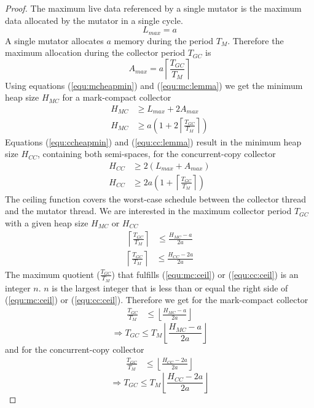 \begin{proof}
The maximum live data referenced by a single mutator is the maximum
data allocated by the mutator in a single cycle.
\begin{equation}
    L_{max} = a
\end{equation}
A single mutator allocates $a$ memory during the period $T_M$.
Therefore the maximum allocation during the collector period
$T_{GC}$ is
%
\begin{equation}
    A_{max} = a \left\lceil\frac{T_{GC}}{T_{M}}\right\rceil
\end{equation}
%
Using equations (\ref{equ:mcheapmin}) and (\ref{equ:mc:lemma}) we
get the minimum heap size $H_{MC}$ for a mark-compact collector
%
\begin{align}
\nonumber
    H_{MC} & \ge L_{max} + 2 A_{max}\\
    H_{MC} & \ge a \left(1 + 2
    \left\lceil\frac{T_{GC}}{T_{M}}\right\rceil\right)
\end{align}
%
Equations (\ref{equ:ccheapmin}) and (\ref{equ:cc:lemma}) result in
the minimum heap size $H_{CC}$, containing both semi-spaces, for the
concurrent-copy collector
%
\begin{align}
\nonumber
    H_{CC} & \ge 2(L_{max} + A_{max})\\
    H_{CC} & \ge 2a \left(1 +
    \left\lceil\frac{T_{GC}}{T_{M}}\right\rceil\right)
\end{align}
%
The ceiling function covers the worst-case schedule between the
collector thread and the mutator thread. We are interested in the
maximum collector period $T_{GC}$ with a given heap size $H_{MC}$ or
$H_{CC}$
%
\begin{align}
    \label{equ:mc:ceil}
    \left\lceil\frac{T_{GC}}{T_{M}}\right\rceil &
    \le \frac{H_{MC}-a}{2a}
\end{align}
%
\begin{align}
    \label{equ:cc:ceil}
    \left\lceil\frac{T_{GC}}{T_{M}}\right\rceil &
    \le \frac{H_{CC}-2a}{2a}
\end{align}
%
The maximum quotient ($\frac{T_{GC}}{T_{M}}$) that fulfills
(\ref{equ:mc:ceil}) or (\ref{equ:cc:ceil}) is an integer $n$. $n$ is
the largest integer that is less than or equal the right side of
(\ref{equ:mc:ceil}) or (\ref{equ:cc:ceil}). Therefore we get for the
mark-compact collector
%
\begin{align}
    \label{equ:mc:floor}
    \frac{T_{GC}}{T_{M}} &
    \le \left\lfloor\frac{H_{MC}-a}{2a}\right\rfloor
\end{align}
%
\begin{equation}
    \Rightarrow T_{GC} \le T_M \left\lfloor\frac{H_{MC}-a}{2a}\right\rfloor
\end{equation}
%
and for the concurrent-copy collector
%
\begin{align}
    \label{equ:cc:floor}
    \frac{T_{GC}}{T_{M}} &
    \le \left\lfloor\frac{H_{CC}-2a}{2a}\right\rfloor
\end{align}
%
\begin{equation}
    \Rightarrow T_{GC} \le T_M \left\lfloor\frac{H_{CC}-2a}{2a}\right\rfloor
\end{equation}


\end{proof}
